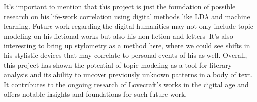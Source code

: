 It's important to mention that this project is just the foundation of possible research on his 
life-work correlation using digital methods like LDA and machine learning. Future work regarding 
the digital humanities may not only include topic modeling on his fictional works but also his 
non-fiction and letters. It's also interesting to bring up stylometry as a method here, where 
we could see shifts in his stylistic devices that may correlate to personal events of his as 
well. Overall, this project has shown the potential of topic modeling as a tool for literary 
analysis and its ability to uncover previously unknown patterns in a body of text. It contributes 
to the ongoing research of Lovecraft's works in the digital age and offers notable insights and 
foundations for such future work.

